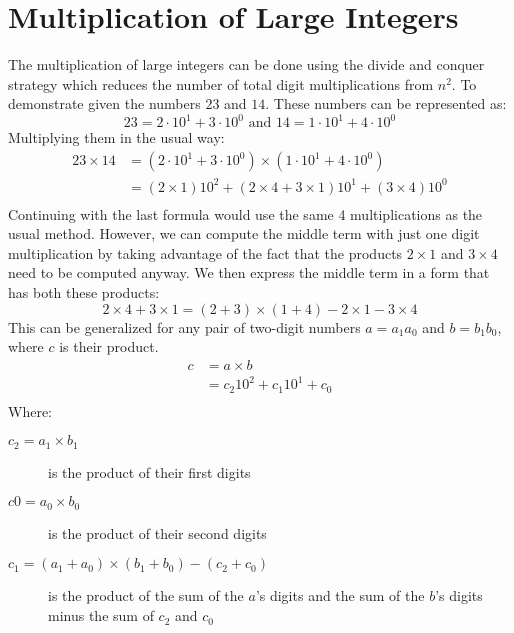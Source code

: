 \documentclass[12pt letter]{report}
\begin{document}
\section{Multiplication of Large Integers}
The multiplication of large integers can be done using the divide and conquer strategy which reduces the number of total
digit multiplications from $n^2$. To demonstrate given the numbers $23$ and $14$. These numbers can be represented as:
\[
  23 = 2 \cdot 10^{1} + 3 \cdot 10^{0} \text{ and } 14 = 1 \cdot 10^{1} + 4 \cdot 10^{0}
\]
Multiplying them in the usual way:
\begin{align*}
  23 \times 14 & = \left( 2 \cdot 10^{1} + 3 \cdot 10^{0} \right) \times \left( 1 \cdot 10^{1} + 4 \cdot 10^{0} \right)               \\
               & = \left( 2 \times 1 \right)10^{2} + \left( 2 \times 4 + 3 \times 1 \right) 10^{1} + \left( 3 \times 4 \right) 10^{0} \\
\end{align*}
Continuing with the last formula would use the same 4 multiplications as the usual method. However, we can compute the
middle term with just one digit multiplication by taking advantage of the fact that the products $2 \times 1$ and $3
  \times 4$ need to be computed anyway. We then express the middle term in a form that has both these products:
\[
  2 \times 4 + 3 \times 1 = \left( 2 + 3 \right) \times  \left( 1 + 4 \right) - 2 \times 1 - 3 \times 4
\]
This can be generalized for any pair of two-digit numbers $a = a_1a_0$ and $b = b_1b_0$, where $c$ is their product.
\begin{align*}
  c & = a \times b                    \\
    & = c_2 10^{2} + c_1 10^{1} + c_0 \\
\end{align*}
Where:
\begin{description}
  \item[$c_2 = a_1 \times b_1 $] is the product of their first digits
  \item[ $c0 = a_0 \times b_0$] is the product of their second digits
  \item [ $c_1 = \left( a_1 + a_0 \right) \times  \left( b_1 + b_0 \right) - \left( c_2 + c_0 \right)   $] is the
        product of the sum of the $a$'s digits and the sum of the $b$'s digits minus the sum of $c_2$ and $c_0$
\end{description}
\end{document}
